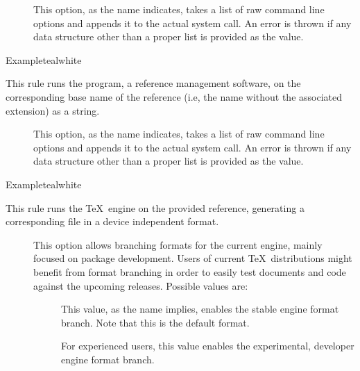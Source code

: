 \begin{description}
\begin{description}
\item[] This option, as the name indicates, takes a list of raw command line options and appends it to the actual system call. An error is thrown if any data structure other than a proper list is provided as the value.
\end{description}

\begin{codebox}{Example}{teal}{\icnote}{white}
\end{codebox}

\item[\rulebox{upbibtex}]
This rule runs the  program, a reference management software, on the corresponding base name of the  reference (i.e, the name without the associated extension) as a string.

\begin{description}
\item[] This option, as the name indicates, takes a list of raw command line options and appends it to the actual system call. An error is thrown if any data structure other than a proper list is provided as the value.
\end{description}

\begin{codebox}{Example}{teal}{\icnote}{white}
\end{codebox}

\item[\rulebox{uplatex}]
This rule runs the  \TeX\ engine on the provided  reference, generating a corresponding file in a device independent format.

\begin{description}
\item[] This option allows branching formats for the current engine, mainly focused on package development. Users of current \TeX\ distributions might benefit from format branching in order to easily test documents and code against the upcoming releases. Possible values are:

\begin{description}
\item[] This value, as the name implies, enables the stable engine format branch. Note that this is the default format.

\item[] For experienced users, this value enables the experimental, developer engine format branch.
\end{description}


\end{description}
\end{description}
